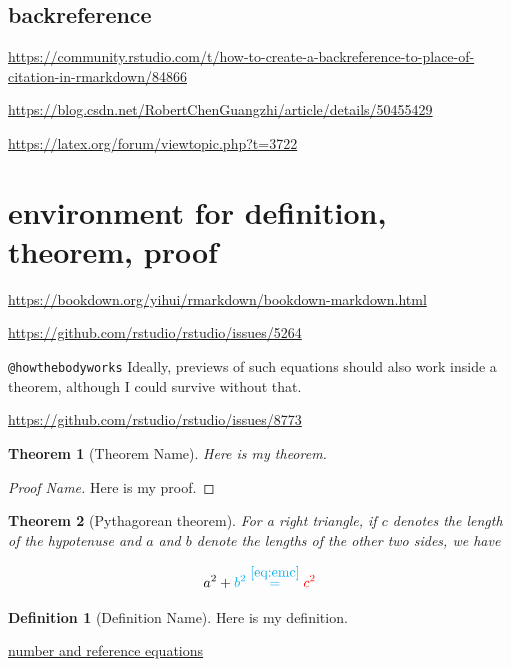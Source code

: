 \documentclass[
]{book}
\newtheorem{theorem}{Theorem}[chapter]
\theoremstyle{definition}
\newtheorem{definition}{Definition}[chapter]
\theoremstyle{definition}
\theoremstyle{definition}
\theoremstyle{definition}
\theoremstyle{remark}
\begin{document}
\subsection{backreference}\label{backreference}

\url{https://community.rstudio.com/t/how-to-create-a-backreference-to-place-of-citation-in-rmarkdown/84866}

\url{https://blog.csdn.net/RobertChenGuangzhi/article/details/50455429}

\url{https://latex.org/forum/viewtopic.php?t=3722}

\section{environment for definition, theorem, proof}\label{environment-for-definition-theorem-proof}

\url{https://bookdown.org/yihui/rmarkdown/bookdown-markdown.html}

\url{https://github.com/rstudio/rstudio/issues/5264}

\texttt{@howthebodyworks} Ideally, previews of such equations should also work inside a theorem, although I could survive without that.

\url{https://github.com/rstudio/rstudio/issues/8773}

\begin{theorem}[Theorem Name]
\protect\hypertarget{thm:label}{}\label{thm:label}Here is my theorem.
\end{theorem}

\begin{proof}[Proof Name]
Here is my proof.
\end{proof}

\begin{theorem}[Pythagorean theorem]
\protect\hypertarget{thm:pyth}{}\label{thm:pyth}For a right triangle, if \(c\) denotes the length of the hypotenuse
and \(a\) and \(b\) denote the lengths of the other two sides, we have

\[a^2 + \color{cyan}b^2 \overset{\ref{eq:emc}}= \color{red}{c^2} \]
\end{theorem}

\begin{definition}[Definition Name]
\protect\hypertarget{def:unnamed-chunk-54}{}\label{def:unnamed-chunk-54}Here is my definition.
\end{definition}

\hyperref[nice-label]{number and reference equations}
\end{document}
